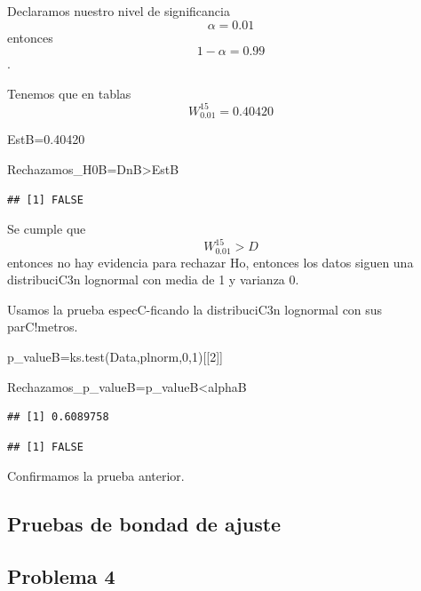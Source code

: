 \documentclass[
]{article}
\newenvironment{Shaded}{\begin{snugshade}}{\end{snugshade}}
\newcommand{\DecValTok}[1]{\textcolor[rgb]{0.00,0.00,0.81}{#1}}
\newcommand{\FloatTok}[1]{\textcolor[rgb]{0.00,0.00,0.81}{#1}}
\newcommand{\FunctionTok}[1]{\textcolor[rgb]{0.00,0.00,0.00}{#1}}
\newcommand{\NormalTok}[1]{#1}
\newcommand{\OtherTok}[1]{\textcolor[rgb]{0.56,0.35,0.01}{#1}}
\newcommand{\SpecialCharTok}[1]{\textcolor[rgb]{0.00,0.00,0.00}{#1}}
\begin{document}
Declaramos nuestro nivel de significancia \[\alpha = 0.01\] entonces
\[1-\alpha = 0.99\].

Tenemos que en tablas \[W_{0.01}^{15}=0.40420\]

\begin{Shaded}
\begin{Highlighting}[]
\NormalTok{EstB}\OtherTok{=}\FloatTok{0.40420}

\NormalTok{Rechazamos\_H0B}\OtherTok{=}\NormalTok{DnB}\SpecialCharTok{\textgreater{}}\NormalTok{EstB}
\end{Highlighting}
\end{Shaded}

\begin{verbatim}
## [1] FALSE
\end{verbatim}

Se cumple que \[W_{0.01}^{15} > D\] entonces no hay evidencia para
rechazar Ho, entonces los datos siguen una distribuciC3n lognormal con
media de 1 y varianza 0.

Usamos la prueba especC-ficando la distribuciC3n lognormal con sus
parC!metros.

\begin{Shaded}
\begin{Highlighting}[]
\NormalTok{p\_valueB}\OtherTok{=}\FunctionTok{ks.test}\NormalTok{(Data,plnorm,}\DecValTok{0}\NormalTok{,}\DecValTok{1}\NormalTok{)[[}\DecValTok{2}\NormalTok{]]}

\NormalTok{Rechazamos\_p\_valueB}\OtherTok{=}\NormalTok{p\_valueB}\SpecialCharTok{\textless{}}\NormalTok{alphaB}
\end{Highlighting}
\end{Shaded}

\begin{verbatim}
## [1] 0.6089758
\end{verbatim}

\begin{verbatim}
## [1] FALSE
\end{verbatim}

Confirmamos la prueba anterior.

\hypertarget{pruebas-de-bondad-de-ajuste-1}{%
\subsection{Pruebas de bondad de
ajuste}\label{pruebas-de-bondad-de-ajuste-1}}

\hypertarget{problema-4}{%
\subsection{Problema 4}\label{problema-4}}
\end{document}
